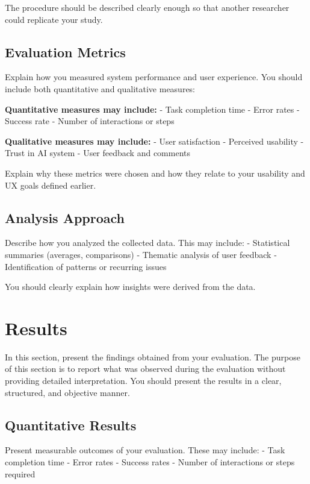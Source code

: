 \documentclass[sigconf]{acmart}
\begin{document}
The procedure should be described clearly enough so that another researcher could replicate your study.

\subsection{Evaluation Metrics}

Explain how you measured system performance and user experience. You should include both quantitative and qualitative measures:

\textbf{Quantitative measures may include:}
- Task completion time
- Error rates
- Success rate
- Number of interactions or steps

\textbf{Qualitative measures may include:}
- User satisfaction
- Perceived usability
- Trust in AI system
- User feedback and comments

Explain why these metrics were chosen and how they relate to your usability and UX goals defined earlier.

\subsection{Analysis Approach}

Describe how you analyzed the collected data. This may include:
- Statistical summaries (averages, comparisons)
- Thematic analysis of user feedback
- Identification of patterns or recurring issues

You should clearly explain how insights were derived from the data.

\section{Results}

In this section, present the findings obtained from your evaluation. The purpose of this section is to report what was observed during the evaluation without providing detailed interpretation. You should present the results in a clear, structured, and objective manner.

\subsection{Quantitative Results}

Present measurable outcomes of your evaluation. These may include:
- Task completion time
- Error rates
- Success rates
- Number of interactions or steps required
\end{document}
